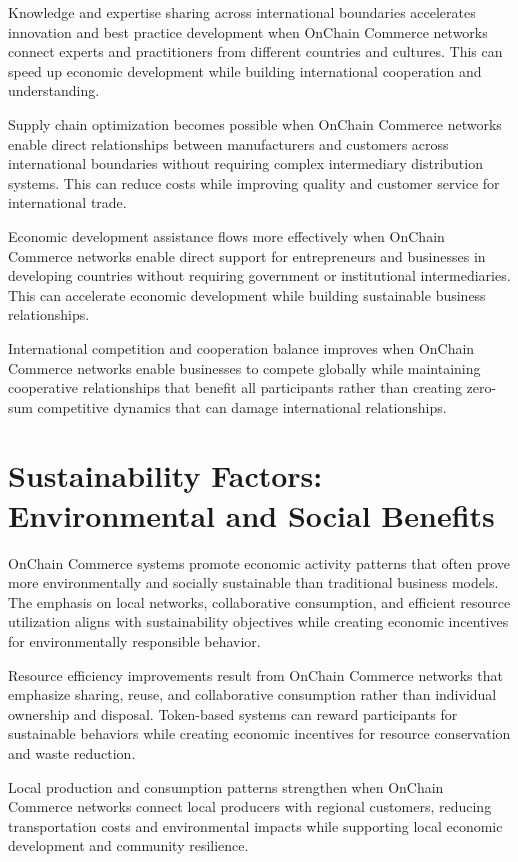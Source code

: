 \documentclass[
  Letterpaper,
]{scrbook}
\begin{document}
Knowledge and expertise sharing across international boundaries
accelerates innovation and best practice development when OnChain
Commerce networks connect experts and practitioners from different
countries and cultures. This can speed up economic development while
building international cooperation and understanding.

Supply chain optimization becomes possible when OnChain Commerce
networks enable direct relationships between manufacturers and customers
across international boundaries without requiring complex intermediary
distribution systems. This can reduce costs while improving quality and
customer service for international trade.

Economic development assistance flows more effectively when OnChain
Commerce networks enable direct support for entrepreneurs and businesses
in developing countries without requiring government or institutional
intermediaries. This can accelerate economic development while building
sustainable business relationships.

International competition and cooperation balance improves when OnChain
Commerce networks enable businesses to compete globally while
maintaining cooperative relationships that benefit all participants
rather than creating zero-sum competitive dynamics that can damage
international relationships.

\section{Sustainability Factors: Environmental and Social
Benefits}\label{sustainability-factors-environmental-and-social-benefits}

OnChain Commerce systems promote economic activity patterns that often
prove more environmentally and socially sustainable than traditional
business models. The emphasis on local networks, collaborative
consumption, and efficient resource utilization aligns with
sustainability objectives while creating economic incentives for
environmentally responsible behavior.

Resource efficiency improvements result from OnChain Commerce networks
that emphasize sharing, reuse, and collaborative consumption rather than
individual ownership and disposal. Token-based systems can reward
participants for sustainable behaviors while creating economic
incentives for resource conservation and waste reduction.

Local production and consumption patterns strengthen when OnChain
Commerce networks connect local producers with regional customers,
reducing transportation costs and environmental impacts while supporting
local economic development and community resilience.
\end{document}
